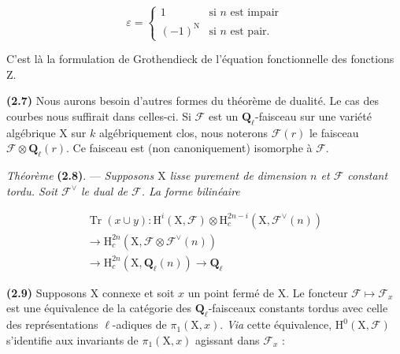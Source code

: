 \documentclass[10pt,leqno]{article}
\begin{document}
\[\varepsilon=\begin{cases}1&\text{si }n\text{ est impair}\\(-1)^{\mathrm N}&\text{si }n\text{ est pair}.\end{cases}\]

\noindent C’est là la formulation de Grothendieck de l’équation fonctionnelle des fonctions \(\mathrm{Z}\).\par

\noindent \textbf{(2.7)} Nous aurons besoin d’autres formes du théorème de dualité. Le cas des courbes nous suffirait dans celles-ci. Si \(\mathcal{F} \) est un \(\mathbf{Q}_{\ell }\)-faisceau sur une variété algébrique \(\mathrm{X}\) sur \(k\) algébriquement clos, nous noterons \(\mathcal{F} (r)\) le faisceau \(\mathcal{F} \otimes \mathbf{Q}_{\ell }(r)\). Ce faisceau est (non canoniquement) isomorphe à \(\mathcal{F} \).\par

\noindent \emph{Théorème} \textbf{(2.8)}. — {\itshape Supposons \(\mathrm{X}\) lisse purement de dimension \(n\) et \(\mathcal{F} \) constant tordu. Soit \(\mathcal{F} ^{\vee }\) le dual de \(\mathcal{F} \). La forme bilinéaire}\par

\begin{equation*}\begin{gathered}\operatorname{Tr}(x\cup y) : \mathrm{H}^{i}(\mathrm{X},\mathcal{F} )\otimes \mathrm{H}_{c}^{2n- i}(\mathrm{X},\mathcal{F} ^{\vee }(n)) \\ \longrightarrow  \mathrm{H}_{c}^{2n}(\mathrm{X},\mathcal{F} \otimes \mathcal{F} ^{\vee }(n)) \\ \longrightarrow  \mathrm{H}_{c}^{2n}(\mathrm{X},\mathbf{Q}_{\ell }(n)) \longrightarrow  \mathbf{Q}_{\ell }\end{gathered}\end{equation*}

\par

\noindent \textbf{(2.9)} Supposons \(\mathrm{X}\) connexe et soit \(x\) un point fermé de \(\mathrm{X}\). Le foncteur \(\mathcal{F} \longmapsto \mathcal{F} _{x}\) est une équivalence de la catégorie des \(\mathbf{Q}_{\ell }\)-faisceaux constants tordus avec celle des représentations \(\ell \)-adiques de \(\pi _{1}(\mathrm{X},x)\). \emph{Via} cette équivalence, \(\mathrm{H}^{0}(\mathrm{X},\mathcal{F} )\) s’identifie aux invariants de \(\pi _{1}(\mathrm{X},x)\) agissant dans \(\mathcal{F} _{x}\) :\par
\end{document}
